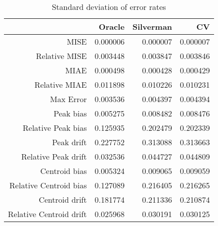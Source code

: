 \begin{table}[ht]
\centering
\begin{tabular}{rrrr}
  \hline
 & Oracle & Silverman & CV \\ 
  \hline
MISE & 0.000006 & 0.000007 & 0.000007 \\ 
  Relative MISE & 0.003448 & 0.003847 & 0.003846 \\ 
  MIAE & 0.000498 & 0.000428 & 0.000429 \\ 
  Relative MIAE & 0.011898 & 0.010226 & 0.010231 \\ 
  Max Error & 0.003536 & 0.004397 & 0.004394 \\ 
  Peak bias & 0.005275 & 0.008482 & 0.008476 \\ 
  Relative Peak bias & 0.125935 & 0.202479 & 0.202339 \\ 
  Peak drift & 0.227752 & 0.313088 & 0.313663 \\ 
  Relative Peak drift & 0.032536 & 0.044727 & 0.044809 \\ 
  Centroid bias & 0.005324 & 0.009065 & 0.009059 \\ 
  Relative Centroid bias & 0.127089 & 0.216405 & 0.216265 \\ 
  Centroid drift & 0.181774 & 0.211336 & 0.210874 \\ 
  Relative Centroid drift & 0.025968 & 0.030191 & 0.030125 \\ 
   \hline
\end{tabular}
\caption{Standard deviation of error rates} 
\label{tbl:stddev_error_rates}
\end{table}
